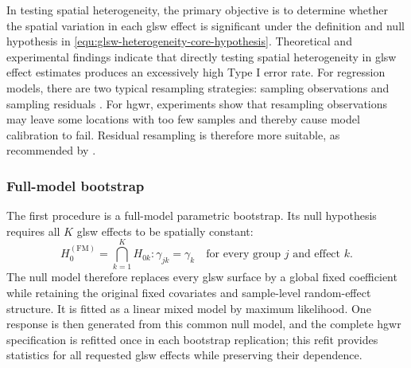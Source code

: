 \documentclass[times]{interact}
\theoremstyle{plain}%
\theoremstyle{definition}
\theoremstyle{remark}
\begin{document}
In testing spatial heterogeneity, the primary objective is to determine whether the spatial variation in each \gls{glsw} effect is significant under the definition and null hypothesis in \autoref{equ:glsw-heterogeneity-core-hypothesis}.
Theoretical and experimental findings indicate that directly testing spatial heterogeneity in \gls{glsw} effect estimates produces an excessively high Type I error rate.
For regression models, there are two typical resampling strategies: sampling observations and sampling residuals \citep{Bittmann-2021}.
For \gls{hgwr}, experiments show that resampling observations may leave some locations with too few samples and thereby cause model calibration to fail.
Residual resampling is therefore more suitable, as recommended by \citet{HarrisBrunsdon-2017}.

\subsubsection{Full-model bootstrap}

The first procedure is a full-model parametric bootstrap.
Its null hypothesis requires all $K$ \gls{glsw} effects to be spatially constant:
\begin{equation}\label{equ:glsw-full-bootstrap-null}
  H_0^{(\mathrm{FM})}
  = \bigcap_{k=1}^{K} H_{0k}
  : \gamma_{jk}=\gamma_k
  \quad\text{for every group }j\text{ and effect }k.
\end{equation}
The null model therefore replaces every \gls{glsw} surface by a global fixed coefficient while retaining the original fixed covariates and sample-level random-effect structure.
It is fitted as a linear mixed model by maximum likelihood.
One response is then generated from this common null model, and the complete \gls{hgwr} specification is refitted once in each bootstrap replication; this refit provides statistics for all requested \gls{glsw} effects while preserving their dependence.
\end{document}
